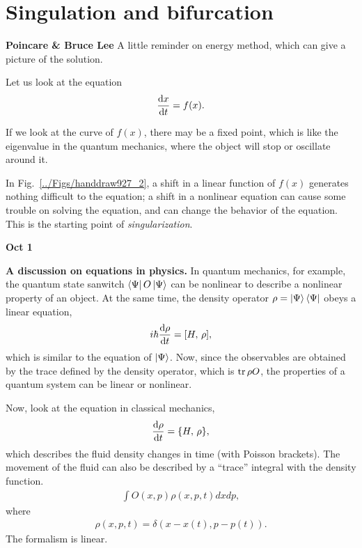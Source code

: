 \chapter{Singulation and bifurcation}\label{chap:bifurcation}
\textbf {Poincare \& Bruce Lee}
A little reminder on energy method, which can give a picture of the solution.

Let us look at the equation
\begin{align}
\frac{{\mathrm d} {x}}{{\mathrm d}t}=f(x).
\end{align}


If we look at the curve of $ f(x) $, there may be a fixed point, which is like the eigenvalue in the quantum mechanics, where the object will stop or oscillate around it. 

In Fig.~\ref{../Figs/handdraw927_2}, a shift in a linear function of $ f(x) $ generates nothing difficult to the equation; a shift in a nonlinear equation can cause some trouble on solving the equation, and can change the behavior of the equation. This is the starting point of \textit{singularization}.


\textbf{Oct 1}

\textbf{A discussion on equations in physics. } In quantum mechanics, for example, the quantum state sanwitch $ \mathinner{\langle{\Psi}|}O\mathinner{|{\Psi}\rangle} $ can be nonlinear to describe a nonlinear property of an object. At the same time, the density operator $ \rho= \mathinner{|{\Psi}\rangle}\mathinner{\langle{\Psi}|} $ obeys a linear equation,
\begin{align}
i\hbar \frac{{\mathrm d} {\rho}}{{\mathrm d}t}=[H,\, \rho],
\end{align}
which is similar to the equation of $ \mathinner{|{\Psi}\rangle} $. Now, since the observables are obtained by the trace defined by the density operator, which is $ \operatorname{tr}{\rho O} $, the properties of a quantum system can be linear or nonlinear. 

Now, look at the equation in classical mechanics,
\begin{align}
\frac{{\mathrm d} {\rho}}{{\mathrm d}t}=\{H,\, \rho\},
\end{align}
which describes the fluid density changes in time (with Poisson brackets). 
The movement of the fluid can also be described by a ``trace'' integral with the density function. 
\begin{align}
\int O(x,p)\rho(x,p,t)dxdp,
\end{align}
where 
\begin{align}
\rho(x,p,t)=\delta(x-x(t),p-p(t)).
\end{align}
The formalism is linear. 

